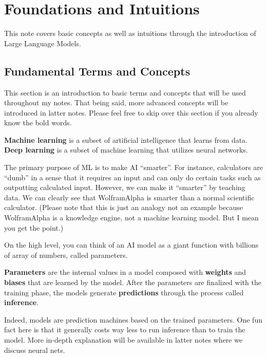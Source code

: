\documentclass[../../main.tex]{subfiles}
\begin{document}
\chapter{Foundations and Intuitions}

This note covers basic concepts as well as intuitions through
the introduction of Large Language Models.

\section{Fundamental Terms and Concepts}

This section is an introduction to basic terms and concepts that
will be used throughout my notes. That being said, more advanced
concepts will be introduced in latter notes. Please feel free
to skip over this section if you already know the bold words.

\begin{definition}{}{}
\textbf{Machine learning} is a subset of artificial intelligence
that learns from data. \textbf{Deep learning} is a subset of
machine learning that utilizes neural networks.
\end{definition}

The primary purpose of ML is to make AI ``smarter''. For instance,
calculators are ``dumb'' in a sense that it requires an input and
can only do certain tasks such as outputting calculated input.
However, we can make it ``smarter'' by teaching data. We can clearly
see that WolframAlpha is smarter than a normal scientific calculator.
(Please note that this is just an analogy not an example because
WolframAlpha is a knowledge engine, not a machine learning model.
But I mean you get the point.)

On the high level, you can think of an AI model as a giant function
with billions of array of numbers, called parameters.

\begin{definition}{}{}
\textbf{Parameters} are the internal values in a model composed
with \textbf{weights} and \textbf{biases} that are learned by the
model. After the parameters are finalized with the training phase,
the models generate \textbf{predictions} through the process called
\textbf{inference}.
\end{definition}

Indeed, models are prediction machines based on the trained
parameters. One fun fact here is that it generally costs way less
to run inference than to train the model. More in-depth explanation
will be available in latter notes where we discuss neural nets.
\end{document}
